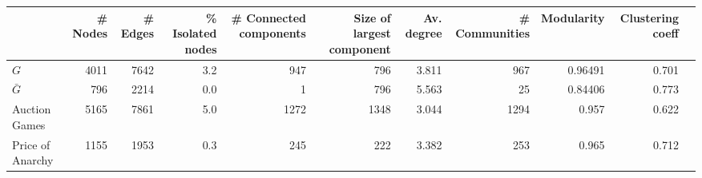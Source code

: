 \begin{tabular}{lrrrrrrrrrr}
\toprule
{} &  \# Nodes &  \# Edges  &  \% Isolated nodes &  \# Connected components &  Size of largest component &  Av. degree &  \# Communities &  Modularity &  Clustering coeff \\
\midrule
$G$              &     4011 &     7642 &        3.2 &                     947 &                        796 &       3.811 &            967 &     0.96491 &             0.701 \\
$\bar{G}$        &      796 &     2214 &        0.0 &                       1 &                        796 &       5.563 &             25 &     0.84406 &             0.773 \\
Auction Games    &     5165 &     7861 &        5.0 &                    1272 &                       1348 &       3.044 &           1294 &       0.957 &             0.622 \\
Price of Anarchy &     1155 &     1953 &        0.3 &                     245 &                        222 &       3.382 &            253 &       0.965 &             0.712 \\
\bottomrule
\end{tabular}
